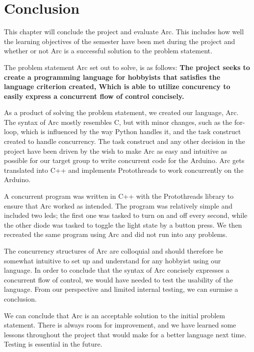 \chapter{Conclusion}\label{cha:conclusion}

This chapter will conclude the project and evaluate Arc. This includes how well the learning objectives of the semester have been met during the project and whether or not Arc is a successful solution to the problem statement.




The problem statement Arc set out to solve, is as follows: 
\textbf{The project seeks to create a programming language for hobbyists that satisfies the language criterion created, Which is able to utilize concurency to easily express a concurrent flow of control concisely.}

As a product of solving the problem statement, we created our language, Arc. The syntax of Arc mostly resembles C, but with minor changes, such as the for-loop, which is influenced by the way Python handles it, and the task construct created to handle concurrency. The task construct and any other decision in the project have been driven by the wish to make Arc as easy and intuitive as possible for our target group to write concurrent code for the Arduino. Arc gets translated into C++ and implements Protothreads to work concurrently on the Arduino.

A concurrent program was written in C++ with the Protothreads library to ensure that Arc worked as intended. The program was relatively simple and included two \gls{led}s; the first one was tasked to turn on and off every second, while the other diode was tasked to toggle the light state by a button press. We then recreated the same program using Arc and did not run into any problems.


The concurrency structures of Arc are colloquial and should therefore be somewhat intuitive to set up and understand for any hobbyist using our language. In order to conclude that the syntax of Arc concisely expresses a concurrent flow of control, we would have needed to test the usability of the language. From our perspective and limited internal testing, we can surmise a conclusion.

We can conclude that Arc is an acceptable solution to the initial problem statement. There is always room for improvement, and we have learned some lessons throughout the project that would make for a better language next time. Testing is essential in the future.